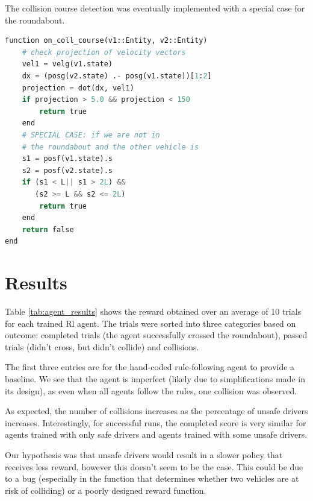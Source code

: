 \documentclass[conference]{IEEEtran}
\begin{document}
The collision course detection was eventually implemented with a special case for the roundabout.
\begin{lstlisting}[language=python]
function on_coll_course(v1::Entity, v2::Entity)
	# check projection of velocity vectors
	vel1 = velg(v1.state)
	dx = (posg(v2.state) .- posg(v1.state))[1:2]
	projection = dot(dx, vel1)
	if projection > 5.0 && projection < 150
		return true
	end
	# SPECIAL CASE: if we are not in
	# the roundabout and the other vehicle is
	s1 = posf(v1.state).s
	s2 = posf(v2.state).s
	if (s1 < L|| s1 > 2L) &&
	   (s2 >= L && s2 <= 2L)
		return true
	end
	return false
end
\end{lstlisting}


\section{Results}
Table \ref{tab:agent_results} shows the reward obtained over an average of 10 trials for each trained Rl agent. The trials were sorted into three categories based on outcome: completed trials (the agent successfully crossed the roundabout), passed trials (didn't cross, but didn't collide) and collisions.

The first three entries are for the hand-coded rule-following agent to provide a baseline. We see that the agent is imperfect (likely due to simplifications made in its design), as even when all agents follow the rules, one collision was observed.

As expected, the number of collisions increases as the percentage of unsafe drivers increases. Interestingly, for successful runs, the completed score is very similar for agents trained with only safe drivers and agents trained with some unsafe drivers.

Our hypothesis was that unsafe drivers would result in a slower policy that receives less reward, however this doesn't seem to be the case. This could be due to a bug (especially in the function that determines whether two vehicles are at risk of colliding) or a poorly designed reward function.
\end{document}
